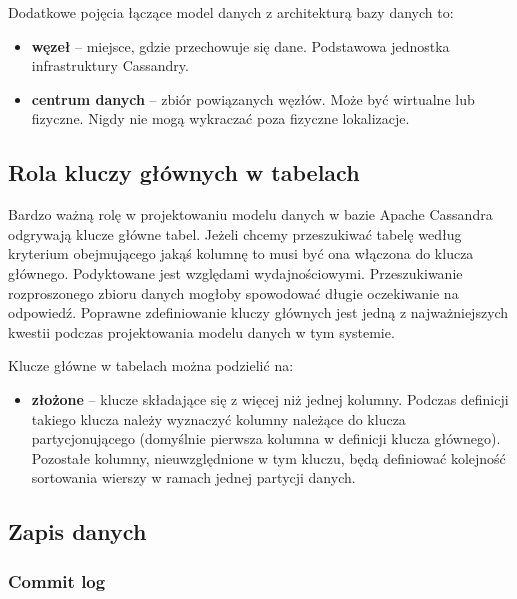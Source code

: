 Dodatkowe pojęcia łączące model danych z architekturą bazy danych to:
\begin{itemize}
    \item \textbf{węzeł} -- miejsce, gdzie przechowuje się dane.
    Podstawowa jednostka infrastruktury Cassandry.
    \item \textbf{centrum danych} -- zbiór powiązanych węzłów. 
    Może być wirtualne lub fizyczne.
    Nigdy nie mogą wykraczać poza fizyczne lokalizacje.
\end{itemize}

\subsection{Rola kluczy głównych w tabelach}

Bardzo ważną rolę w projektowaniu modelu danych w bazie Apache Cassandra odgrywają klucze główne tabel.
Jeżeli chcemy przeszukiwać tabelę według kryterium obejmującego jakąś kolumnę to musi być ona włączona do klucza głównego.
Podyktowane jest względami wydajnościowymi.
Przeszukiwanie rozproszonego zbioru danych mogłoby spowodować długie oczekiwanie na odpowiedź.
Poprawne zdefiniowanie kluczy głównych jest jedną z najważniejszych kwestii podczas projektowania modelu danych w tym systemie.

Klucze główne w tabelach można podzielić na:
\begin{itemize}

    \item \textbf{złożone} -- klucze składające się z więcej niż jednej kolumny. 
    Podczas definicji takiego klucza należy wyznaczyć kolumny należące do klucza partycjonującego (domyślnie pierwsza kolumna w definicji klucza głównego).
    Pozostałe kolumny, nieuwzględnione w tym kluczu, będą definiować kolejność sortowania wierszy w ramach jednej partycji danych.
\end{itemize}

\subsection{Zapis danych}

\subsubsection{Commit log}


